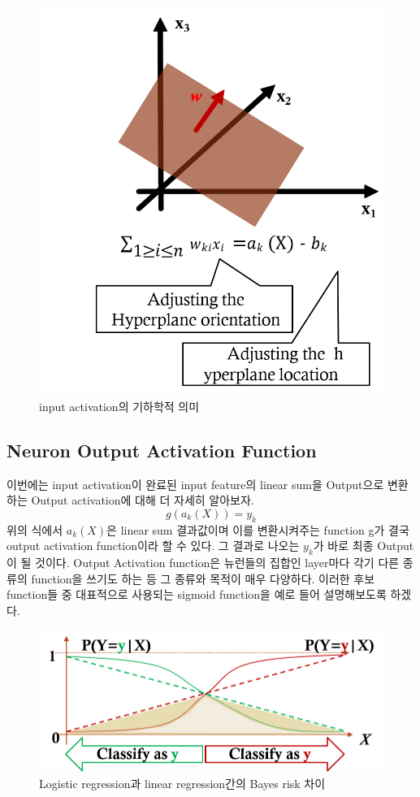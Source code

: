 \documentclass[draft=false]{oblivoir}
\begin{document}
\begin{figure}[ht] \centering 
\includegraphics[scale=0.5]{fig14_3.png} 
\caption{input activation의 기하학적 의미}
\label{fig:14-3}
\end{figure}
\subsection{Neuron Output Activation Function}
이번에는 input activation이 완료된 input feature의 linear sum을 Output으로 변환하는 Output activation에 대해 더 자세히 알아보자.
\begin{equation}
g(a_{k}(X)) = y_{k}
\label{eq:14-2-6}
\end{equation}
위의 식에서 $a_{k}(X)$은 linear sum 결과값이며 이를 변환시켜주는 function g가 결국 output activation function이라 할 수 있다. 그 결과로 나오는 $y_{k}$가 바로 최종 Output이 될 것이다. Output Activation function은 뉴런들의 집합인 layer마다 각기 다른 종류의 function을 쓰기도 하는 등 그 종류와 목적이 매우 다양하다. 이러한 후보 function들 중 대표적으로 사용되는 sigmoid function을 예로 들어 설명해보도록 하겠다.
\begin{figure}[ht] \centering 
\includegraphics[scale=0.5]{fig14_4.png} 
\caption{Logistic regression과 linear regression간의 Bayes risk 차이}
\label{fig:14-4}
\end{figure}
\end{document}
